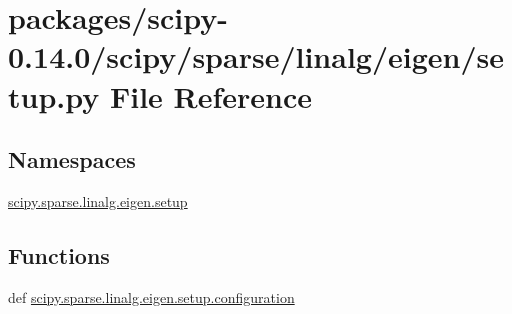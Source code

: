 \hypertarget{packages_2scipy-0_814_80_2scipy_2sparse_2linalg_2eigen_2setup_8py}{}\section{packages/scipy-\/0.14.0/scipy/sparse/linalg/eigen/setup.py File Reference}
\label{packages_2scipy-0_814_80_2scipy_2sparse_2linalg_2eigen_2setup_8py}
\subsection*{Namespaces}
\begin{DoxyCompactItemize}
\item 
 \hyperlink{namespacescipy_1_1sparse_1_1linalg_1_1eigen_1_1setup}{scipy.\+sparse.\+linalg.\+eigen.\+setup}
\end{DoxyCompactItemize}
\subsection*{Functions}
\begin{DoxyCompactItemize}
\item 
def \hyperlink{namespacescipy_1_1sparse_1_1linalg_1_1eigen_1_1setup_aa4aaad40e8754db020b529495511340d}{scipy.\+sparse.\+linalg.\+eigen.\+setup.\+configuration}
\end{DoxyCompactItemize}
